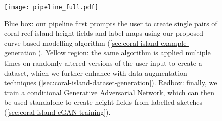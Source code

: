 \begin{figure}[H]
    \texttt{[image: pipeline\_full.pdf]}
    \caption[\cref{chap:coral-island}'s pipeline]{Blue box: our pipeline first prompts the user to create single pairs of coral reef island height fields and label maps using our proposed curve-based modelling algorithm (\cref{sec:coral-island-example-generation}). Yellow region: the same algorithm is applied multiple times on randomly altered versions of the user input to create a dataset, which we further enhance with data augmentation techniques (\cref{sec:coral-island-dataset-generation}). Redbox: finally, we train a conditional Generative Adversarial Network, which can then be used standalone to create height fields from labelled sketches (\cref{sec:coral-island-cGAN-training}).}
    \label{fig:coral-island-pipeline}
\end{figure}










